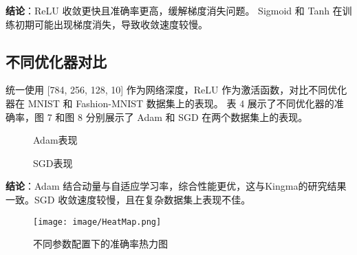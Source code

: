 \documentclass[a4paper, twocolumn]{article}
\begin{document}
\textbf{结论}：ReLU 收敛更快且准确率更高，缓解梯度消失问题。
              Sigmoid 和 Tanh 在训练初期可能出现梯度消失，导致收敛速度较慢。

\subsection{不同优化器对比}
统一使用 [784, 256, 128, 10] 作为网络深度，ReLU 作为激活函数，对比不同优化器在 MNIST 和 Fashion-MNIST 数据集上的表现。
表 4 展示了不同优化器的准确率，图 7 和图 8 分别展示了 Adam 和 SGD 在两个数据集上的表现。
\begin{table}[H]
    \centering
    \caption{优化器性能对比}
    \label{tab:optimizer}
\end{table}

\begin{figure}[H]
    \centering
    \caption{Adam表现}
    \label{fig:31}
\end{figure}

\begin{figure}[H]
    \centering
    \caption{SGD表现}
    \label{fig:32}
\end{figure}

\textbf{结论}：Adam 结合动量与自适应学习率，综合性能更优，这与Kingma的研究结果\cite{kingma2015adam}一致。SGD 收敛速度较慢，且在复杂数据集上表现不佳。

\begin{figure}[H]
    \centering
    \texttt{[image: image/HeatMap.png]}
    \caption{不同参数配置下的准确率热力图}
    \label{fig:heatmap}
\end{figure}
\end{document}
